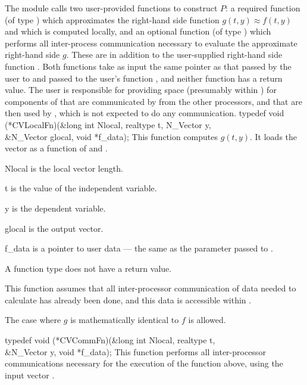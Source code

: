 The {\cvbbdpre} module calls two user-provided functions to construct $P$: 
a required function  (of type ) which approximates
the right-hand side function $g(t,y) \approx f(t,y)$ and which is computed
locally, and an optional function  (of type ) which performs 
all inter-process communication necessary to evaluate the approximate right-hand
side $g$.  These are in addition to the user-supplied right-hand side function
.  Both functions take as input the same pointer  as that passed
by the user to  and passed to the user's function ,
and neither function has a return value. The user is responsible for
providing space (presumably within ) for components of 
that are communicated by  from the other processors, and that are
then used by , which is not expected to do any communication.
{
  typedef void (*CVLocalFn)(&long int Nlocal, realtype t, N\_Vector y, \\
                            &N\_Vector glocal, void *f\_data);
}
{
  This function computes $g(t,y)$. It loads the vector
   as a function of  and .  
}
{
  \begin{args}[Nlocal]
  \item[Nlocal] 
    is the local vector length.
  \item[t]
    is the value of the independent variable.
  \item[y]
    is the dependent variable. 
  \item[glocal]
    is the output vector.
  \item[f\_data]
    is a pointer to user data --- the same as the       
    parameter passed to .  
  \end{args}
}
{
  A  function type does not have a return value.
}
{
  This function assumes that all inter-processor communication of data needed to 
  calculate  has already been done, and this data is accessible within
  .

  The case where $g$ is mathematically identical to $f$ is allowed.
}
{
  typedef void (*CVCommFn)(&long int Nlocal, realtype t,  \\
                           &N\_Vector y, void *f\_data);
}
{
  This function performs all inter-processor communications necessary 
  for the execution of the  function above, using the input vector .
}
